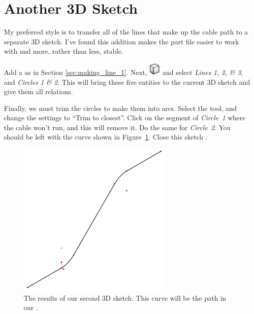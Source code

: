 \section{Another 3D Sketch}

\label{sec:second-3d-sketch}

My preferred style is to transfer all of the lines that make up the cable path
to a separate 3D sketch. I've found this addition makes the part file easier to
work with and more, rather than less, stable.

Add a  as in Section \ref{sec:making_line_1}. Next,  \includegraphics{images/symbols/convert-entities.png} and select \emph{Lines 1, 2, \& 3}, and \emph{Circles 1 \& 2}. This will bring these five
entities to the current 3D sketch and give them all  relations.

Finally, we must trim the circles to make them into arcs. Select the 
tool, and change the settings to ``Trim to closest''. Click on the segment
of \emph{Circle~1} where the cable won't run, and this will remove it. Do the same for
\emph{Circle~2}. You should be left with the curve shown in Figure~\ref{fig:second-3d-sketch}. Close this sketch
.

\begin{figure}[H]
\begin{center}
\includegraphics[height=3in]{images/figures/second-3d-sketch.png}
\end{center}
\caption{The results of our second 3D sketch. This curve will be the path in our
.
\label{fig:second-3d-sketch}}

\end{figure}

